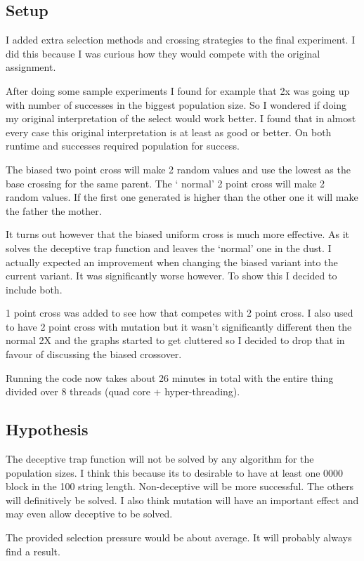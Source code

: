 \documentclass{article}
\begin{document}
\begin{empfile}
\subsection{Setup}
I added extra selection methods and crossing strategies to
the final experiment. I did this because I was curious how they would
compete with the original assignment.

After doing some sample experiments I found for example that 2x was going
up with number of successes in the biggest population size. So I wondered 
if doing my original interpretation of the select would work better.
I found that in almost every case this original interpretation is at least as
good or better. On both runtime and successes required population for success.

The biased two point cross will make 2 random values and use the lowest as
the base crossing for the same parent. The ` normal' 2 point cross will make
2 random values. If the first one generated is higher than the other one it
will make the father the mother.

It turns out however that the biased uniform cross is much more effective.
As it solves the deceptive trap function and leaves the `normal' one in
the dust. I actually expected an improvement when changing the biased
variant into the current variant. It was significantly worse however.
To show this I decided to include both.

1 point cross was added to see how that competes with 2 point cross.
I also used to have 2 point cross with
mutation but it wasn't significantly different then the normal 2X
and the graphs started to get cluttered so I decided to drop that in
favour of discussing the biased crossover.

Running the code now takes about 26 minutes in total with the
entire thing divided over 8 threads (quad core + hyper-threading). 

\subsection{Hypothesis}
The deceptive trap function will not be solved by any algorithm for
the population sizes. I think this because its to desirable to have
at least one 0000 block in the 100 string length.
Non-deceptive will be more successful. The others will definitively be solved.
I also think mutation will have an important effect and may even
allow deceptive to be solved.

The provided selection pressure would be about average.
It will probably always find a result.


\end{empfile}
\end{document}

